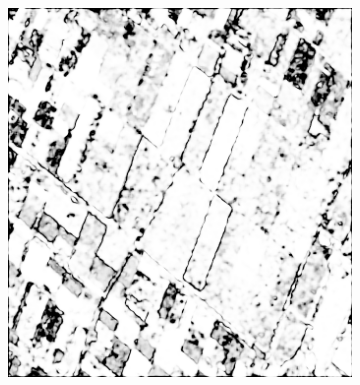 \begin{figure}[tp]
\centering
         \begin{subfigure}[b]{0.3\textwidth}
          	\includegraphics[width=\textwidth]{Figures/Kron/Conf/C}
          	\caption{}
          	\label{fig:Cconf}
          \end{subfigure}
          ~
         \begin{subfigure}[b]{0.3\textwidth}

\end{subfigure}
\end{figure}
